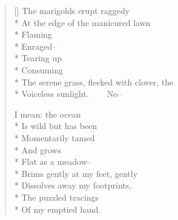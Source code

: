 \label{ch:fragment}
\settowidth{\versewidth}{The serene grass, flecked with clover, the}
\begin{verse}[\versewidth]
The marigolds erupt raggedy\\*
At the edge of the manicured lawn\\*
Flaming\\*
Enraged--\\*
Tearing up\\*
Consuming\\*
The serene grass, flecked with clover, the\\*
Voiceless sunlight.     No--

I mean: the ocean\\*
Is wild but has been\\*
Momentarily tamed\\*
And grows\\*
Flat as a meadow--\\*
Brims gently at my feet, gently\\*
Dissolves away my footprints,\\*
The puzzled tracings\\*
Of my emptied hand.
\end{verse}
